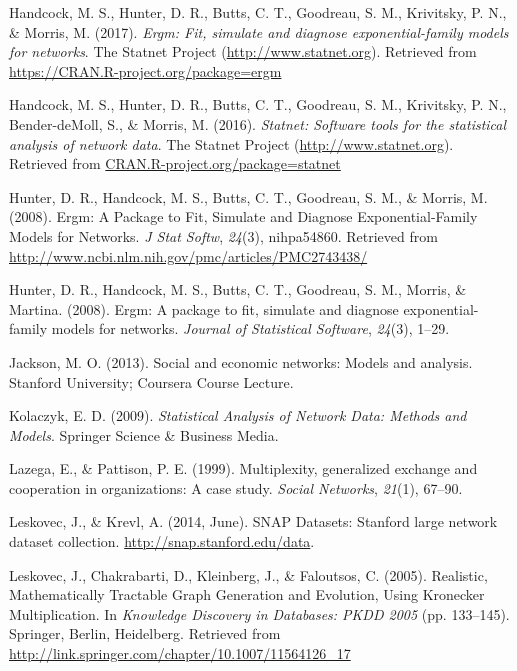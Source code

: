 \documentclass[12pt,twoside]{amherstthesis}
\begin{document}
  \hypertarget{ref-ergmpackagemanual}{}
  Handcock, M. S., Hunter, D. R., Butts, C. T., Goodreau, S. M.,
  Krivitsky, P. N., \& Morris, M. (2017). \emph{Ergm: Fit, simulate and
  diagnose exponential-family models for networks}. The Statnet Project
  (\url{http://www.statnet.org}). Retrieved from
  \url{https://CRAN.R-project.org/package=ergm}
  
  \hypertarget{ref-statnetpackagemanual}{}
  Handcock, M. S., Hunter, D. R., Butts, C. T., Goodreau, S. M.,
  Krivitsky, P. N., Bender-deMoll, S., \& Morris, M. (2016).
  \emph{Statnet: Software tools for the statistical analysis of network
  data}. The Statnet Project (\url{http://www.statnet.org}). Retrieved
  from \url{CRAN.R-project.org/package=statnet}
  
  \hypertarget{ref-hunter_ergm:_2008}{}
  Hunter, D. R., Handcock, M. S., Butts, C. T., Goodreau, S. M., \&
  Morris, M. (2008). Ergm: A Package to Fit, Simulate and Diagnose
  Exponential-Family Models for Networks. \emph{J Stat Softw},
  \emph{24}(3), nihpa54860. Retrieved from
  \url{http://www.ncbi.nlm.nih.gov/pmc/articles/PMC2743438/}
  
  \hypertarget{ref-ergmpackagearticle}{}
  Hunter, D. R., Handcock, M. S., Butts, C. T., Goodreau, S. M., Morris,
  \& Martina. (2008). Ergm: A package to fit, simulate and diagnose
  exponential-family models for networks. \emph{Journal of Statistical
  Software}, \emph{24}(3), 1--29.
  
  \hypertarget{ref-jacksonergms2013}{}
  Jackson, M. O. (2013). Social and economic networks: Models and
  analysis. Stanford University; Coursera Course Lecture.
  
  \hypertarget{ref-kolaczyk_statistical_2009}{}
  Kolaczyk, E. D. (2009). \emph{Statistical Analysis of Network Data:
  Methods and Models}. Springer Science \& Business Media.
  
  \hypertarget{ref-lazega1999multiplexity}{}
  Lazega, E., \& Pattison, P. E. (1999). Multiplexity, generalized
  exchange and cooperation in organizations: A case study. \emph{Social
  Networks}, \emph{21}(1), 67--90.
  
  \hypertarget{ref-snapnets}{}
  Leskovec, J., \& Krevl, A. (2014, June). SNAP Datasets: Stanford large
  network dataset collection. \url{http://snap.stanford.edu/data}.
  
  \hypertarget{ref-leskovec_realistic_2005}{}
  Leskovec, J., Chakrabarti, D., Kleinberg, J., \& Faloutsos, C. (2005).
  Realistic, Mathematically Tractable Graph Generation and Evolution,
  Using Kronecker Multiplication. In \emph{Knowledge Discovery in
  Databases: PKDD 2005} (pp. 133--145). Springer, Berlin, Heidelberg.
  Retrieved from
  \url{http://link.springer.com/chapter/10.1007/11564126_17}
  
\end{document}
